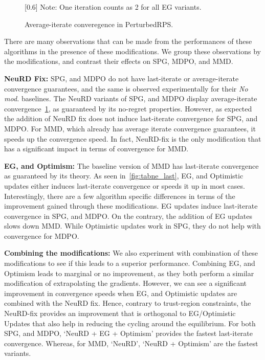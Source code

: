 \begin{figure}
	\centering
	\hspace*{-2cm}
	\scalebox{0.6}[0.6]{}
	\tiny{Note: One iteration counts as 2 for all EG variants.}
	\caption{Average-iterate converegence in PerturbedRPS.}\label{fig:tabne_avg}
\end{figure}

There are many observations that can be made from the performances of these algorithms in the
presence of these modifications.
We group these observations by the modifications, and contrast their effects on SPG, MDPO, and MMD.

\textbf{NeuRD Fix:}
SPG, and MDPO do not have last-iterate or average-iterate convergence guarantees, and the same is
observed experimentally for their \textit{No mod.
} baselines.
The NeuRD variants of SPG, and MDPO display average-iterate convergence~\ref{fig:tabne_avg}, as
guaranteed by its no-regret properties.
However, as expected the addition of NeuRD fix does not induce last-iterate convergence for SPG,
and MDPO.
For MMD, which already has average iterate convergence guarantees, it speeds up the convergence
speed.
In fact, NeuRD-fix is the only modification that has a significant impact in terms of convergence
for MMD.

\textbf{EG, and Optimism:}
The baseline version of MMD has last-iterate convergence as guaranteed by its theory.
As seen in~\ref{fig:tabne_last}, EG, and Optimistic updates either induces last-iterate convergence
or speeds it up in most cases.
Interestingly, there are a few algorithm specific differences in terms of the improvement gained
through these modifications.
EG updates induce last-iterate convergence in SPG, and MDPO.
On the contrary, the addition of EG updates slows down MMD.
While Optimistic updates work in SPG, they do not help with convergence for MDPO.

\textbf{Combining the modifications:}
We also experiment with combination of these modifications to see if this leads to a superior
performance.
Combining EG, and Optimism leads to marginal or no improvement, as they both perform a similar
modification of extrapolating the gradients.
However, we can see a significant improvement in convergence speeds when EG, and Optimistic updates
are combined with the NeuRD fix.
Hence, contrary to trust-region constraints, the NeuRD-fix provides an improvement that is
orthogonal to EG/Optimistic Updates that also help in reducing the cycling around the equilibrium.
For both SPG, and MDPO, `NeuRD + EG + Optimism' provides the fastest last-iterate convergence.
Whereas, for MMD, `NeuRD', `NeuRD + Optimism' are the fastest variants.

